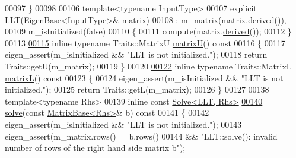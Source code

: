 \begin{DoxyCode}
00097     \}
00098 
00106     \textcolor{keyword}{template}<\textcolor{keyword}{typename} InputType>
\hyperlink{group___cholesky___module_a1848a00addade9a0f7f70493c52ecc9d}{00107}     \textcolor{keyword}{explicit} \hyperlink{group___cholesky___module_a1848a00addade9a0f7f70493c52ecc9d}{LLT}(\hyperlink{group___core___module_struct_eigen_1_1_eigen_base}{EigenBase<InputType>}& matrix)
00108       : m\_matrix(matrix.derived()),
00109         m\_isInitialized(false)
00110     \{
00111       compute(matrix.\hyperlink{group___core___module_a324b16961a11d2ecfd2d1b7dd7946545}{derived}());
00112     \}
00113 
\hyperlink{group___cholesky___module_a18a390f085567e650e8345cc7e7c0df8}{00115}     \textcolor{keyword}{inline} \textcolor{keyword}{typename} Traits::MatrixU \hyperlink{group___cholesky___module_a18a390f085567e650e8345cc7e7c0df8}{matrixU}()\textcolor{keyword}{ const}
00116 \textcolor{keyword}{    }\{
00117       eigen\_assert(m\_isInitialized && \textcolor{stringliteral}{"LLT is not initialized."});
00118       \textcolor{keywordflow}{return} Traits::getU(m\_matrix);
00119     \}
00120 
\hyperlink{group___cholesky___module_a7f4a3eedbf82e7ce2d6bf0dcd84cdfa3}{00122}     \textcolor{keyword}{inline} \textcolor{keyword}{typename} Traits::MatrixL \hyperlink{group___cholesky___module_a7f4a3eedbf82e7ce2d6bf0dcd84cdfa3}{matrixL}()\textcolor{keyword}{ const}
00123 \textcolor{keyword}{    }\{
00124       eigen\_assert(m\_isInitialized && \textcolor{stringliteral}{"LLT is not initialized."});
00125       \textcolor{keywordflow}{return} Traits::getL(m\_matrix);
00126     \}
00127 
00138     \textcolor{keyword}{template}<\textcolor{keyword}{typename} Rhs>
00139     \textcolor{keyword}{inline} \textcolor{keyword}{const} \hyperlink{group___core___module_class_eigen_1_1_solve}{Solve<LLT, Rhs>}
\hyperlink{group___cholesky___module_a3738bb3ce6f9b837a2beb432b937499f}{00140}     \hyperlink{group___cholesky___module_a3738bb3ce6f9b837a2beb432b937499f}{solve}(\textcolor{keyword}{const} \hyperlink{group___core___module_class_eigen_1_1_matrix_base}{MatrixBase<Rhs>}& b)\textcolor{keyword}{ const}
00141 \textcolor{keyword}{    }\{
00142       eigen\_assert(m\_isInitialized && \textcolor{stringliteral}{"LLT is not initialized."});
00143       eigen\_assert(m\_matrix.rows()==b.rows()
00144                 && \textcolor{stringliteral}{"LLT::solve(): invalid number of rows of the right hand side matrix b"});

\end{DoxyCode}
